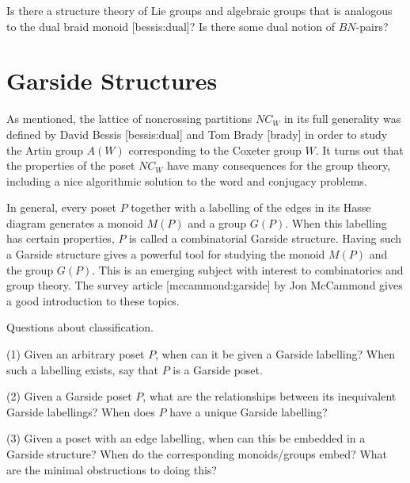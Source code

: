 \documentclass[12pt,letterpaper, reqno]{amsart}
\begin{document}
\begin{problemblock}

\begin{problem}[3.4] 
Is there a structure theory of Lie groups and algebraic groups that is analogous to the dual braid monoid [bessis:dual]? Is there some dual notion of $BN$-pairs?
\end{problem}
\end{problemblock}


\section{Garside Structures}
As mentioned, the lattice of noncrossing partitions $NC_W$ in its full generality was defined by David Bessis [bessis:dual] and Tom Brady [brady] in order to study the Artin group $ A(W)$ corresponding to the Coxeter group $W$. It turns out that the properties of the poset $NC_W$ have many consequences for the group theory, including a nice algorithmic solution to the word and conjugacy problems.

In general, every poset $P$ together with a labelling of the edges in its Hasse diagram generates a monoid $M(P)$ and a group $G(P)$. When this labelling has certain properties, $P$ is called a combinatorial Garside structure. Having such a Garside structure gives a powerful tool for studying the monoid $M(P)$ and the group $G(P)$. This is an emerging subject with interest to combinatorics and group theory. The survey article [mccammond:garside] by Jon McCammond gives a good introduction to these topics.

\begin{problemblock}
\begin{problem}[4.1]  Questions about classification.

(1) Given an arbitrary poset $P$, when can it be given a Garside labelling? When such a labelling exists, say that $P$ is a Garside poset.

(2) Given a Garside poset $P$, what are the relationships between its inequivalent Garside labellings? When does $P$ have a unique Garside labelling?

(3) Given a poset with an edge labelling, when can this be embedded in a Garside structure? When do the corresponding monoids/groups embed? What are the minimal obstructions to doing this?

\end{problem}
\end{problemblock}
\end{document}

